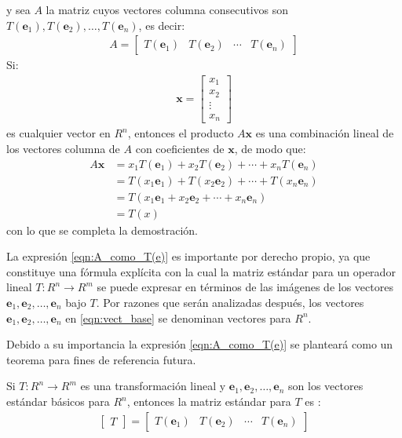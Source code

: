 \documentclass[a4paper,12pt]{article}
\begin{document}
y sea $A$ la matriz cuyos vectores columna consecutivos son
$T(\mathbf{e}_1),T(\mathbf{e}_2),\ldots,T(\mathbf{e}_n)$, es decir:
\begin{align}
  A=
  \begin{bmatrix}
    T(\mathbf{e}_1) &T(\mathbf{e}_2) &\cdots&T(\mathbf{e}_n) 
  \end{bmatrix}
  \label{eqn:A_como_T(e)}
\end{align}
Si:
\begin{align*}
  \mathbf{x}=
  \begin{bmatrix}
    x_1 \\ x_2 \\ \vdots \\ x_n
  \end{bmatrix}
\end{align*}
es cualquier vector en $R^n$, entonces el producto $A\mathbf{x}$ es una
combinación lineal de los vectores columna de $A$ con coeficientes de
$\mathbf{x}$, de modo que:
\begin{align*}
  A\mathbf{x}&=x_1T(\mathbf{e}_1)+x_2T(\mathbf{e}_2)+\cdots+x_nT(\mathbf{e}_n) \\
  &=T(x_1\mathbf{e}_1)+T(x_2\mathbf{e}_2)+\cdots+T(x_n\mathbf{e}_n) \\
  &=T(x_1\mathbf{e}_1+x_2\mathbf{e}_2+\cdots+x_n\mathbf{e}_n) \\
  &=T(x)
\end{align*}
con lo que se completa la demostración.

La expresión \eqref{eqn:A_como_T(e)} es importante por derecho propio, ya que
constituye una fórmula explícita con la cual la matriz estándar para un
operador lineal $T:R^n\rightarrow R^m$ se puede expresar en términos de las
imágenes de los vectores $\mathbf{e}_1,\mathbf{e}_2,\ldots,\mathbf{e}_n$ bajo
$T$. Por razones que serán analizadas después, los vectores
$\mathbf{e}_1,\mathbf{e}_2,\ldots,\mathbf{e}_n$ en \eqref{eqn:vect_base} se
denominan vectores  para $R^n$.

Debido a su importancia la expresión \eqref{eqn:A_como_T(e)} se planteará como
un teorema para fines de referencia futura.

\begin{theorem}
  Si $T:R^n\rightarrow R^m$ es una transformación lineal y
  $\mathbf{e}_1,\mathbf{e}_2,\ldots,\mathbf{e}_n$ son los vectores estándar
  básicos para $R^n$, entonces la matriz estándar para $T$ es :
  \begin{align*}
    \begin{bmatrix}
      T
    \end{bmatrix}=
  \begin{bmatrix}
    T(\mathbf{e}_1) &T(\mathbf{e}_2) &\cdots&T(\mathbf{e}_n) 
  \end{bmatrix}
  \end{align*}
  \label{theo:matriz_estandar}
\end{theorem}
\end{document}
